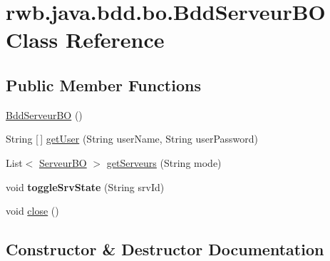 \hypertarget{classrwb_1_1java_1_1bdd_1_1bo_1_1_bdd_serveur_b_o}{}\section{rwb.\+java.\+bdd.\+bo.\+Bdd\+Serveur\+BO Class Reference}
\label{classrwb_1_1java_1_1bdd_1_1bo_1_1_bdd_serveur_b_o}
\subsection*{Public Member Functions}
\begin{DoxyCompactItemize}
\item 
\hyperlink{classrwb_1_1java_1_1bdd_1_1bo_1_1_bdd_serveur_b_o_a441eaf5556c9669d9965fe6baa48d29d}{Bdd\+Serveur\+BO} ()
\item 
String \mbox{[}$\,$\mbox{]} \hyperlink{classrwb_1_1java_1_1bdd_1_1bo_1_1_bdd_serveur_b_o_a1676076b91c4f4a89058dd1d450fa8a9}{get\+User} (String user\+Name, String user\+Password)
\item 
List$<$ \hyperlink{classrwb_1_1java_1_1server_1_1bo_1_1_serveur_b_o}{Serveur\+BO} $>$ \hyperlink{classrwb_1_1java_1_1bdd_1_1bo_1_1_bdd_serveur_b_o_aaa2465c7a6a802e7c6402c08cba64ebf}{get\+Serveurs} (String mode)
\item 
\mbox{\label{classrwb_1_1java_1_1bdd_1_1bo_1_1_bdd_serveur_b_o_af01913a769f3d4fe1bcde6cb538f6246}} 
void {\bfseries toggle\+Srv\+State} (String srv\+Id)
\item 
void \hyperlink{classrwb_1_1java_1_1bdd_1_1bo_1_1_bdd_serveur_b_o_a15a008ef1314b8bc6190c2b0cc24223f}{close} ()
\end{DoxyCompactItemize}


\subsection{Constructor \& Destructor Documentation}
\mbox{\label{classrwb_1_1java_1_1bdd_1_1bo_1_1_bdd_serveur_b_o_a441eaf5556c9669d9965fe6baa48d29d}} 

